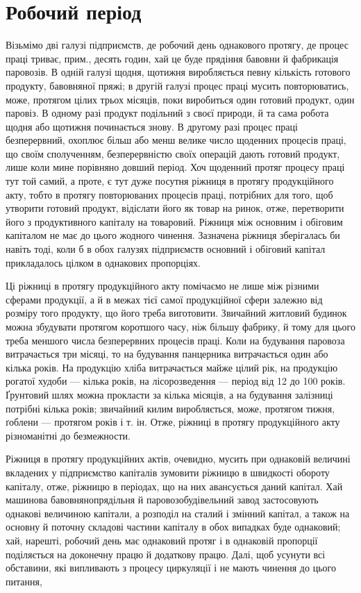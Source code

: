 
\section{Робочий період}

Візьмімо дві галузі підприємств, де робочий день однакового протягу,
де процес праці триває, прим., десять годин, хай це буде прядіння
бавовни й фабрикація паровозів. В одній галузі щодня, щотижня виробляється
певну кількість готового продукту, бавовняної пряжі; в другій
галузі процес праці мусить повторюватись, може, протягом цілих трьох
місяців, поки виробиться один готовий продукт, один паровіз. В одному
разі продукт подільний з своєї природи, й та сама робота щодня або
щотижня починається знову. В другому разі процес праці безперервний,
охоплює більш або менш велике число щоденних процесів праці, що своїм
сполученням, безперервністю своїх операцій дають готовий продукт, лише
коли мине порівняно довший період. Хоч щоденний протяг процесу праці
тут той самий, а проте, є тут дуже посутня ріжниця в протягу продукційного
акту, тобто в протягу повторюваних процесів праці, потрібних
для того, щоб утворити готовий продукт, відіслати його як товар на
ринок, отже, перетворити його з продуктивного капіталу на товаровий.
Ріжниця між основним і обіговим капіталом не має до цього жодного
чинення. Зазначена ріжниця зберігалась би навіть тоді, коли б в обох
галузях підприємств основний і обіговий капітал прикладалось цілком
в однакових пропорціях.

Ці ріжниці в протягу продукційного акту помічаємо не лише між
різними сферами продукції, а й в межах тієї самої продукційної сфери
залежно від розміру того продукту, що його треба виготовити. Звичайний
житловий будинок можна збудувати протягом коротшого часу,
ніж більшу фабрику, й тому для цього треба меншого числа безперервних
процесів праці. Коли на будування паровоза витрачається три місяці,
то на будування панцерника витрачається один або кілька років. На продукцію
хліба витрачається майже цілий рік, на продукцію рогатої худоби
— кілька років, на лісорозведення — період від 12 до 100 років. Ґрунтовий
шлях можна прокласти за кілька місяців, а на будування залізниці
потрібні кілька років; звичайний килим виробляється, може, протягом
тижня, ґоблени — протягом років і т. ін. Отже, ріжниці в протягу продукційного
акту різноманітні до безмежности.

Ріжниця в протягу продукційних актів, очевидно, мусить при однаковій
величині вкладених у підприємство капіталів зумовити ріжницю в
швидкості обороту капіталу, отже, ріжницю в періодах, що на них авансується
даний капітал. Хай машинова бавовнянопрядільня й паровозобудівельний
завод застосовують однакові величиною капітали, а розподіл
на сталий і змінний капітал, а також на основну й поточну складові частини
капіталу в обох випадках буде однаковий; хай, нарешті, робочий
день має однаковий протяг і в однаковій пропорції поділяється на доконечну
працю й додаткову працю. Далі, щоб усунути всі обставини, які
випливають з процесу циркуляції і не мають чинення до цього питання,
\parbreak{}  %
